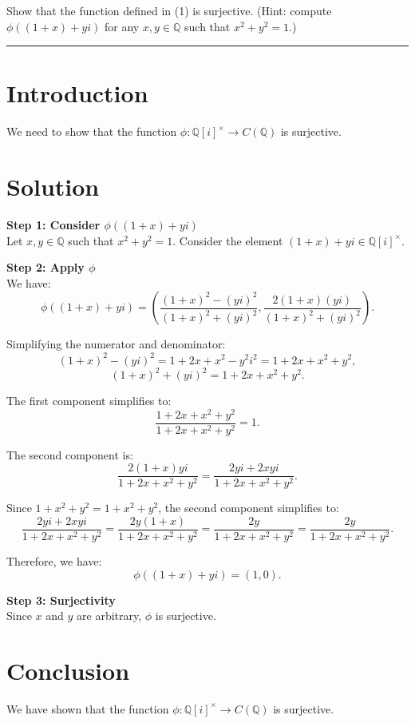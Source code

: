 \documentclass[12pt]{amsart}
\theoremstyle{definition}
\numberwithin{equation}{section}
\newcommand{\Q}{\mathbb{Q}}
\begin{document}
\begin{exercise}{3} Show that the function defined in (1) is surjective. (Hint: compute \(\phi((1+x)+yi)\) for any \(x,y \in \Q \) such that \(x^2+y^2=1\).)

    \noindent\rule{\linewidth}{1pt}

    \section*{Introduction}
    We need to show that the function \(\phi: \Q{[i]}^{\times} \rightarrow C(\Q)\) is surjective.

    \section*{Solution}
    \noindent \textbf{Step 1: Consider \(\phi((1+x)+yi)\)}\\
    Let \(x, y \in \Q \) such that \(x^2 + y^2 = 1\). Consider the element \((1+x) + yi \in \Q{[i]}^{\times}\).

    \noindent \textbf{Step 2: Apply \(\phi \)}\\
    We have:
    \[
    \phi((1+x) + yi) = \left(\frac{{(1+x)}^2 - {(yi)}^2}{{(1+x)}^2 + {(yi)}^2}, \frac{2(1+x)(yi)}{{(1+x)}^2 + {(yi)}^2}\right).
    \]

    Simplifying the numerator and denominator:
    \[
    {(1+x)}^2 - {(yi)}^2 = 1 + 2x + x^2 - y^2 i^2 = 1 + 2x + x^2 + y^2,
    \]
    \[
    {(1+x)}^2 + {(yi)}^2 = 1 + 2x + x^2 + y^2.
    \]

    The first component simplifies to:
    \[
    \frac{1 + 2x + x^2 + y^2}{1 + 2x + x^2 + y^2} = 1.
    \]

    The second component is:
    \[
    \frac{2(1+x)yi}{1 + 2x + x^2 + y^2} = \frac{2yi + 2xyi}{1 + 2x + x^2 + y^2}.
    \]

    Since \(1 + x^2 + y^2 = 1 + x^2 + y^2\), the second component simplifies to:
    \[
    \frac{2yi + 2xyi}{1 + 2x + x^2 + y^2} = \frac{2y(1+x)}{1 + 2x + x^2 + y^2} = \frac{2y}{1 + 2x + x^2 + y^2} = \frac{2y}{1 + 2x + x^2 + y^2}.
    \]

    Therefore, we have:
    \[
    \phi((1+x) + yi) = (1, 0).
    \]

    \noindent \textbf{Step 3: Surjectivity}\\
    Since \(x\) and \(y\) are arbitrary, \(\phi \) is surjective.

    \section*{Conclusion}
    We have shown that the function \(\phi: \Q{[i]}^{\times} \rightarrow C(\Q)\) is surjective.

\end{exercise}
\end{document}
